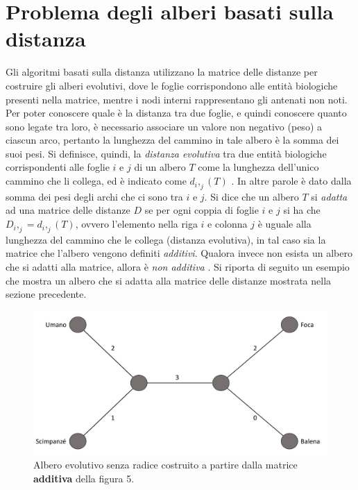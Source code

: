 \section{Problema degli alberi basati sulla distanza}
Gli algoritmi basati sulla distanza utilizzano la matrice delle distanze per costruire gli alberi evolutivi, dove le foglie corrispondono alle entità biologiche presenti nella matrice, mentre i nodi interni rappresentano gli antenati non noti. Per poter conoscere quale è la distanza tra due foglie, e quindi conoscere quanto sono legate tra loro, è necessario associare un valore non negativo (peso) a ciascun arco, pertanto la lunghezza del cammino in tale albero è la somma dei suoi pesi. Si definisce, quindi, la \textit{distanza evolutiva} tra due entità biologiche corrispondenti alle foglie $i$ e $j$ di un albero $T$ come la lunghezza dell'unico cammino che li collega, ed è indicato come $d_i,_j(T)$ \cite{bioinfalganactivelearningapproachparttwo}. In altre parole è dato dalla somma dei pesi degli archi che ci sono tra $i$ e $j$.
\newline
Si dice che un albero $T$ si \textit{adatta} ad una matrice delle distanze $D$ se per ogni coppia di foglie $i$ e $j$ si ha che $D_i,_j=d_i,_j(T)$, ovvero l'elemento nella riga $i$ e colonna $j$ è uguale alla lunghezza del cammino che le collega (distanza evolutiva), in tal caso sia la matrice che l'albero vengono definiti \textit{additivi}. Qualora invece non esista un albero che si adatti alla matrice, allora è \textit{non additiva} \cite{UniCaliforniaadditivetree}.
\newline
Si riporta di seguito un esempio che mostra un albero che si adatta alla matrice delle distanze mostrata nella sezione precedente.
\begin{figure}[h!]
	\includegraphics[width=\linewidth]{unrooted_tree_created_by_figure_5.jpg}
 	\caption{Albero evolutivo senza radice costruito a partire dalla matrice \textbf{additiva} della figura 5.}
  	\label{fig:EvolutionaryTreeExample}
\end{figure}

